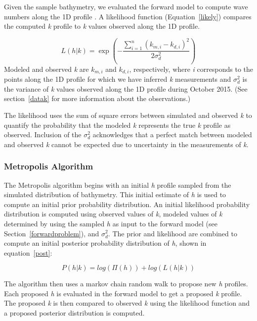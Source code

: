 Given the sample bathymetry, we evaluated the forward model to compute wave numbers along the 1D profile%
. A likelihood function (Equation~\ref{likely}) compares the computed \textit{k} profile to \textit{k} values observed along the 1D profile. 

\begin{equation} \label{likely}
L\left(h|%
k\right)=\exp\left(- \frac{\sum\limits_{i=1}^n({k}_{m,i}-k_{d,i})^2}{2\sigma_{d}^2}\right)
\end{equation} 
Modeled and observed \textit{k} are ${k}_{m,i}$ and $k_{d,i}$, respectively, where \textit{i} corresponds to the points along the 1D profile for which we have inferred \textit{k} measurements and $\sigma_{d}^2$ is the variance of \textit{k} values observed along the 1D profile during October 2015. (See section~\ref{datak} for more information about the observations.) 

The likelihood uses the sum of square errors between simulated and observed \textit{k} to quantify the probability that the modeled \textit{k} represents the true \textit{k} profile as observed. Inclusion of the $\sigma_{d}^2$ acknowledges that a perfect match between modeled and observed \textit{k} cannot be expected due to uncertainty in the measurements of \textit{k}.

\subsubsection{Metropolis Algorithm}
The Metropolis algorithm begins with an initial \textit{h} profile sampled from the simulated distribution of bathymetry. This initial estimate of \textit{h} is used to compute an initial prior probability distribution. An initial likelihood probability distribution is computed using observed values of \textit{k}, modeled values of \textit{k} determined by using the sampled \textit{h} as input to the forward model (see Section~\ref{forwardproblem}), and $\sigma_{d}^2$. The prior and likelihood are combined to compute an initial posterior probability distribution of \textit{h}, shown in equation~\ref{post}:

\begin{equation}\label{post}
P(h|%
k) = log(\Pi(h)) + log(L(h|%
k))
\end{equation}

The algorithm then uses a markov chain random walk to propose new \textit{h} profiles. Each proposed \textit{h} is evaluated in the forward model to get a proposed \textit{k} profile. The proposed \textit{k} is then compared to observed \textit{k} using the likelihood function and a proposed posterior distribution is computed.

